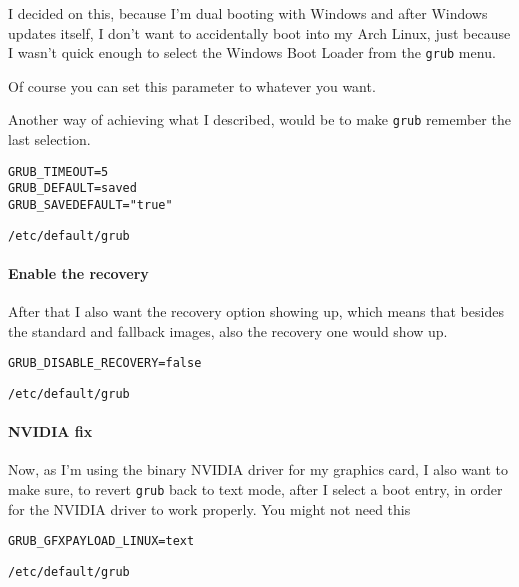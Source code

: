 \documentclass[10pt]{dustdoc}
\begin{document}
\begin{NOTE}
    I decided on this, because I’m dual booting with Windows and after Windows updates itself, I don’t want to accidentally boot into my Arch Linux, just because I wasn’t quick enough to select the Windows Boot Loader from the \texttt{grub} menu.

    Of course you can set this parameter to whatever you want.

    Another way of achieving what I described, would be to make \texttt{grub} remember the last selection.

    \begin{mintedlisting}
        \begin{verbatim}
GRUB_TIMEOUT=5
GRUB_DEFAULT=saved
GRUB_SAVEDEFAULT="true"
        \end{verbatim}

        \caption{\texttt{/etc/default/grub}}
    \end{mintedlisting}
\end{NOTE}

\paragraph{Enable the recovery}%
\label{par:enable-the-recovery}

After that I also want the recovery option showing up, which means that besides the standard and fallback images, also the recovery one would show up.

\begin{mintedlisting}
    \begin{verbatim}
GRUB_DISABLE_RECOVERY=false
    \end{verbatim}

    \caption{\texttt{/etc/default/grub}}
\end{mintedlisting}

\paragraph{NVIDIA fix}%
\label{par:nvidia-fix}

Now, as I’m using the binary NVIDIA driver for my graphics card, I also want to make sure, to revert \texttt{grub} back to text mode, after I select a boot entry, in order for the NVIDIA driver to work properly.
You might not need this

\begin{mintedlisting}
    \begin{verbatim}
GRUB_GFXPAYLOAD_LINUX=text
    \end{verbatim}

    \caption{\texttt{/etc/default/grub}}
\end{mintedlisting}
\end{document}
